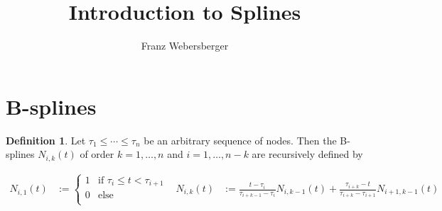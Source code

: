 \documentclass{article}
\title{Introduction to Splines}
\author{Franz Webersberger}
\theoremstyle{plain}\newtheorem{thm}{Theorem}
\theoremstyle{definition}\newtheorem{defn}[thm]{Definition}
\begin{document}
\maketitle

\newpage

\section*{B-splines}

\begin{defn}
Let $\tau_{1} \leq \cdots \leq \tau_{n}$ be an arbitrary sequence of nodes.
Then the B-splines $N_{i,k}(t)$ of order $k=1,\dots,n$ and $i=1,\dots,n-k$ 
are recursively defined by
\end{defn}

\begin{subequations}

	\begin{align}
			N_{i,1}(t) &:= 
					\begin{cases}
						1 & \text{if } \tau_{i} \leq t < \tau_{i+1}	\\
						0 & \text{else} \\
					\end{cases}
	\end{align}

	\begin{align}
			N_{i,k}(t) &:= 
				\frac{t-\tau_{i}}{\tau_{i+k-1}-\tau_{i}} N_{i,k-1}(t) + 
				\frac{\tau_{i+k}-t}{\tau_{i+k}-\tau_{i+1}} N_{i+1,k-1}(t)
	\end{align}							

\end{subequations}
\end{document}
